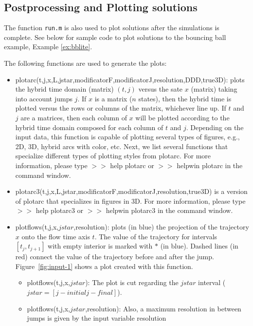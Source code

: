 \documentclass{article}
\begin{document}
\label{scr:initialization}


\subsection{Postprocessing and Plotting solutions}\label{sec:plotfcn}

The function {\tt run.m} is also used to plot solutions after the simulations is complete. See below for sample code to plot solutions to the bouncing ball example, Example \ref{ex:bblite}.

\label{scr:postprocesing}


\noindent The following functions are used to generate the plots:
\begin{itemize}
\item plotarc(t,j,x,L,jstar,modificatorF,modificatorJ,resolution,DDD,true3D): plots the hybrid time domain (matrix) $(t,j)$ versus the sate $x$  (matrix) taking into account jumps $j$. If $x$ is a matrix ($n$ states), then the hybrid time is plotted versus the rows or columns of the matrix, whichever line up. If $t$ and $j$ are a matrices, then each column of $x$ will be plotted according to the hybrid time domain composed for each column of $t$ and $j$. Depending on the input data, this function is capable of plotting several types of figures, e.g., 2D, 3D, hybrid arcs with color, etc. Next, we list several functions that specialize different types of plotting styles from plotarc. For more information, please type $>>$ help plotarc or $>>$ helpwin plotarc in the command window.
\item plotarc3(t,j,x,L,jstar,modificatorF,modificatorJ,resolution,true3D) is a version of plotarc that specializes in figures in 3D. For more information, please type $>>$ help plotarc3 or $>>$ helpwin plotarc3 in the command window.
\item plotflows(t,j,x,$jstar$,resolution): plots (in blue) the projection of the
  trajectory $x$ onto the flow time axis $t$.  The value of the
  trajectory for intervals $[t_j,t_{j+1}]$ with empty interior is
  marked with $*$ (in blue).  Dashed lines (in red) connect the value of the
  trajectory before and after the jump. 
  Figure~\ref{fig:input-1} shows a plot created with this function.
 \begin{itemize}
 	\item plotflows(t,j,x,$jstar$): The plot is cut regarding the $jstar$ interval ($jstar = [j-initial j-final]$).
	\item plotflows(t,j,x,$jstar$,resolution): Also, a maximum resolution in between jumps is given by the input variable resolution

\end{itemize}
\end{itemize}
\end{document}
